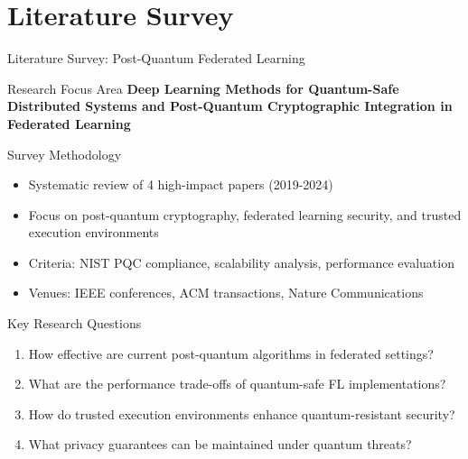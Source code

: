\documentclass[aspectratio=169,11pt]{beamer}
\newcommand{\highlight}[1]{\textcolor{qflareblue}{\textbf{#1}}}
\begin{document}
\section{Literature Survey}
\begin{frame}{Literature Survey: Post-Quantum Federated Learning}

\begin{block}{Research Focus Area}
\highlight{Deep Learning Methods for Quantum-Safe Distributed Systems and Post-Quantum Cryptographic Integration in Federated Learning}
\end{block}

\begin{block}{Survey Methodology}
\begin{itemize}
    \item Systematic review of 4 high-impact papers (2019-2024)
    \item Focus on post-quantum cryptography, federated learning security, and trusted execution environments
    \item Criteria: NIST PQC compliance, scalability analysis, performance evaluation
    \item Venues: IEEE conferences, ACM transactions, Nature Communications
\end{itemize}
\end{block}

\begin{block}{Key Research Questions}
\begin{enumerate}
    \item How effective are current post-quantum algorithms in federated settings?
    \item What are the performance trade-offs of quantum-safe FL implementations?
    \item How do trusted execution environments enhance quantum-resistant security?
    \item What privacy guarantees can be maintained under quantum threats?
\end{enumerate}
\end{block}

\end{frame}
\end{document}
